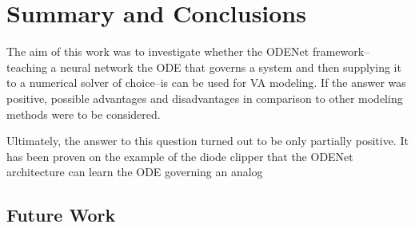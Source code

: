 \chapter{Summary and Conclusions}
\label{chapter:conclusions}


The aim of this work was to investigate whether the ODENet framework--teaching a neural network the \ac{ODE} that governs a system and then supplying it to a numerical solver of choice--is can be used for \ac{VA} modeling. If the answer was positive, possible advantages and disadvantages in comparison to other modeling methods were to be considered.

Ultimately, the answer to this question turned out to be only partially positive. It has been proven on the example of the diode clipper that the ODENet architecture can learn the \ac{ODE} governing an analog 


\section{Future Work}

